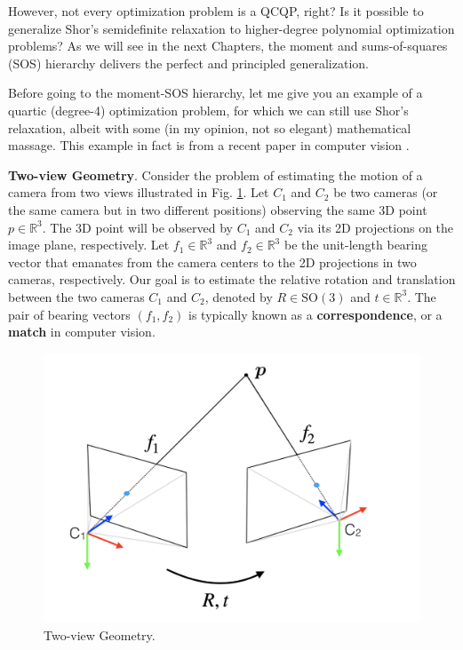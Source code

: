 \documentclass[
]{book}
\theoremstyle{definition}
\theoremstyle{definition}
\theoremstyle{definition}
\theoremstyle{definition}
\theoremstyle{remark}
\begin{document}
However, not every optimization problem is a QCQP, right? Is it possible to generalize Shor's semidefinite relaxation to higher-degree polynomial optimization problems? As we will see in the next Chapters, the moment and sums-of-squares (SOS) hierarchy delivers the perfect and principled generalization.

Before going to the moment-SOS hierarchy, let me give you an example of a quartic (degree-4) optimization problem, for which we can still use Shor's relaxation, albeit with some (in my opinion, not so elegant) mathematical massage. This example in fact is from a recent paper in computer vision \citep{briales18cvpr-certifiably}.

\textbf{Two-view Geometry}. Consider the problem of estimating the motion of a camera from two views illustrated in Fig. \ref{fig:two-view}. Let \(C_1\) and \(C_2\) be two cameras (or the same camera but in two different positions) observing the same 3D point \(p \in \mathbb{R}^{3}\). The 3D point will be observed by \(C_1\) and \(C_2\) via its 2D projections on the image plane, respectively. Let \(f_1 \in \mathbb{R}^{3}\) and \(f_2 \in \mathbb{R}^{3}\) be the unit-length bearing vector that emanates from the camera centers to the 2D projections in two cameras, respectively. Our goal is to estimate the relative rotation and translation between the two cameras \(C_1\) and \(C_2\), denoted by \(R \in \mathrm{SO}(3)\) and \(t \in \mathbb{R}^{3}\). The pair of bearing vectors \((f_1,f_2)\) is typically known as a \textbf{correspondence}, or a \textbf{match} in computer vision.

\begin{figure}

{\centering \includegraphics[width=0.6\linewidth]{images/two_view} 

}

\caption{Two-view Geometry.}\label{fig:two-view}
\end{figure}
\end{document}
